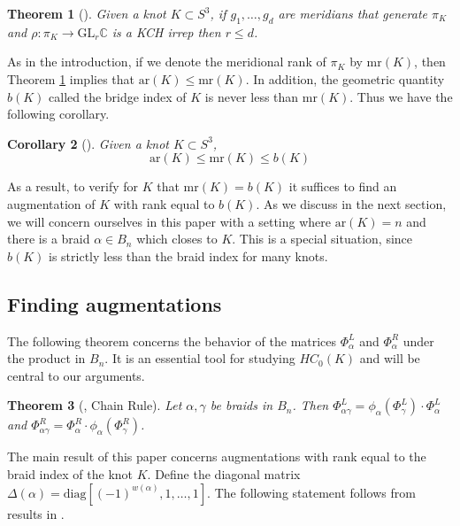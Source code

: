 \documentclass[11pt]{amsart}
\def\C{{\mathbb C}}
\newtheorem{thm}{Theorem}[section]
\newtheorem{cor}[thm]{Corollary}
\theoremstyle{definition}
\begin{document}
  \begin{thm}[\cite{Cor13b}] Given a knot $K\subset S^3$, if $g_1,\ldots,g_d$ are meridians that generate $\pi_K$ and $\rho:\pi_K\to\text{GL}_r\C$ is a KCH irrep then $r\le d$.
  \label{thm:DimBound}
  \end{thm}

  As in the introduction, if we denote the meridional rank of $\pi_K$ by $\text{mr}(K)$, then Theorem \ref{thm:DimBound} implies that $\text{ar}(K)\le\text{mr}(K)$. In addition, the geometric quantity $b(K)$ called the bridge index of $K$ is never less than $\text{mr}(K)$. Thus we have the following corollary.
    
\begin{cor}[\cite{Cor13b}] Given a knot $K\subset S^3$,
$$\text{ar}(K)\le\text{mr}(K)\le b(K)$$
\label{cor:DimBound}
\end{cor}

  As a result, to verify for $K$ that $\text{mr}(K)=b(K)$ it suffices to find an augmentation of $K$ with rank equal to $b(K)$. As we discuss in the next section, we will concern ourselves in this paper with a setting where $\text{ar}(K)=n$ and there is a braid $\alpha\in B_n$ which closes to $K$. This is a special situation, since $b(K)$ is strictly less than the braid index for many knots.

\subsection{Finding augmentations}
\label{SecBG_AugExist}
  The following theorem concerns the behavior of the matrices $\Phi_\alpha^L$ and $\Phi_\alpha^R$ under the product in $B_n$. It is an essential tool for studying $HC_0(K)$ and will be central to our arguments.

  \begin{thm}[\cite{Ng05}, Chain Rule] Let $\alpha,\gamma$ be braids in $B_n$. Then $\Phi_{\alpha\gamma}^L = \phi_\alpha(\Phi_{\gamma}^L)\cdot\Phi_\alpha^L$ and $\Phi_{\alpha\gamma}^R = \Phi_\alpha^R\cdot\phi_\alpha(\Phi_{\gamma}^R)$.
  \label{thm:ChainRule}
  \end{thm}

  The main result of this paper concerns augmentations with rank equal to the braid index of the knot $K$. Define the diagonal matrix $\Delta(\alpha)=\text{diag}[(-1)^{w(\alpha)},1,\ldots,1]$. The following statement follows from results in \cite[Section 5]{Cor13b}.
\end{document}
